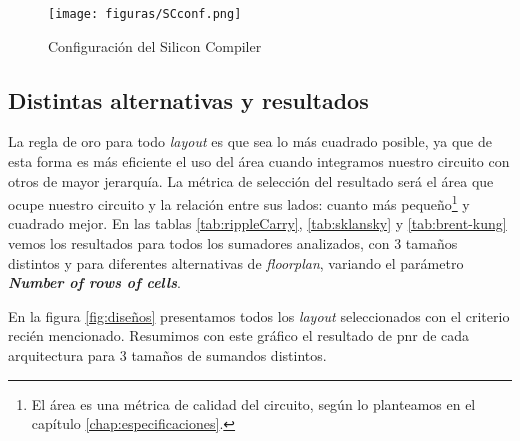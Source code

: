 \begin{figure}[h]
\centering
\texttt{[image: figuras/SCconf.png]}
  \caption{Configuración del Silicon Compiler}
  \label{fig:SCconf}
\end{figure}


\subsection{Distintas alternativas y resultados}
La regla de oro para todo \emph{layout} es que sea lo más cuadrado posible, ya que de esta forma es más eficiente el uso del área cuando integramos nuestro circuito con otros de mayor jerarquía. La métrica de selección del resultado será el área que ocupe nuestro circuito y la relación entre sus lados: cuanto más pequeño\footnote{El área es una métrica de calidad del circuito, según lo planteamos en el capítulo \ref{chap:especificaciones}.} y cuadrado mejor. En las tablas \ref{tab:rippleCarry}, \ref{tab:sklansky} y \ref{tab:brent-kung} vemos los resultados para todos los sumadores analizados, con 3 tamaños distintos y para diferentes alternativas de \emph{floorplan}, variando el parámetro \textbf{\emph{Number of rows of cells}}.

En la figura \ref{fig:diseños} presentamos todos los \emph{layout} seleccionados con el criterio recién mencionado. Resumimos con este gráfico el resultado de \gls{pnr} de cada arquitectura para 3 tamaños de sumandos distintos.
\begin{table}[h]
\centering
{}
\caption{Ubicación y conexionado para Ripple carry en 3 tamaños: 8, 16 y 32 bits. Las dimensiones de los lados y el área están en $\lambda$ y $\lambda^2$ respectivamente.}
\label{tab:rippleCarry}
\end{table}

